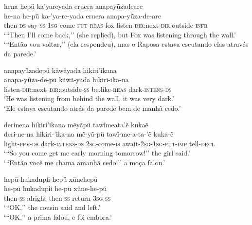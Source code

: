 \documentclass[output=paper,
modfonts,nonflat
]{langsci/langscibook}
\begin{document}

\ea   hena hepü ka'yareyada eruera anapayü̃zadeare \\[.3em]
\gll  he-na he-pü ka-'ya-re-yada eruera anapa-yü̃za-de-are\\
then-\textsc{ds} say-\textsc{ss} \textsc{1sg}-come-\textsc{fut-reas} fox listen-\textsc{dir:}next-\textsc{dir:}outside-\textsc{infr}\\
\glt    `{``}Then I'll come back,'' (she replied), but Fox was listening through the wall.' \\
`{``}Então vou voltar,'' (ela respondeu), mas o Raposa estava escutando elas através da parede.' \\
\z          


\ea   anapayü̃zadepü kãwãyada  hikiri'ikana \\[.3em]
\gll anapa-yü̃za-de-pü kãwã-yada  hikiri-ika-na\\
listen-\textsc{dir:}next--\textsc{dir:}outside-\textsc{ss} be.like-\textsc{reas} dark-\textsc{intens-ds}\\
\glt   `He was listening from behind the wall, it was very dark.' \\
`Ele estava escutando atrás da parede bem de manhã cedo.' \\
\z

\newpage
\ea   derinena hikiri'ikana mẽyãpü tawĩmeata'ẽ kukaẽ \\[.3em]
\gll deri-ne-na hikiri-'ika-na mẽ-yã-pü tawĩ-me-a-ta-'ẽ kuka-ẽ\\
light-\textsc{pfv-ds} dark-\textsc{intens-ds} 2\textsc{sg}-come-\textsc{is} await-\textsc{2sg-1sg-fut-imp} tell-\textsc{decl}\\
\glt    `{``}So you come get me early morning tomorrow!'' the girl said.' \\
 `{``}Então você me chama amanhã cedo!'' a moça falou.' \\
\z

\ea   	hepü hukadupɨi hepü xünehepü \\[.3em]
\gll 	he-pü hukadupɨi he-pü xüne-he-pü\\
then-\textsc{ss} alright then-\textsc{ss} return-\textsc{3sg-ss}\\
\glt 	`{``}OK,'' the cousin said and left.' \\
`{``}OK,'' a prima falou, e foi embora.'
\end{document}
